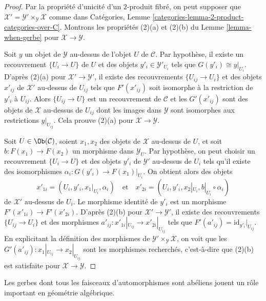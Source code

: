 \begin{proof}
Par la propriété d'unicité d'un $2$-produit fibré, on peut supposer que
$\mathcal{X}' = \mathcal{Y}' \times_\mathcal{Y} \mathcal{X}$
comme dans
Catégories, Lemme \ref{categories-lemma-2-product-categories-over-C}.
Montrons les propriétés (2)(a) et (2)(b) du
Lemme \ref{lemma-when-gerbe}
pour $\mathcal{X} \to \mathcal{Y}$.

\medskip\noindent
Soit $y$ un objet de $\mathcal{Y}$ au-dessus de l'objet $U$
de $\mathcal{C}$. Par hypothèse, il existe
un recouvrement $\{U_i \to U\}$ de $U$ et des objets
$y'_i \in \mathcal{Y}'_{U_i}$ tels que $G(y'_i) \cong y|_{U_i}$.
D'après (2)(a) pour $\mathcal{X}' \to \mathcal{Y}'$, il existe des
recouvrements $\{U_{ij} \to U_i\}$ et des objets $x'_{ij}$ de
$\mathcal{X}'$ au-dessus de $U_{ij}$ tels que $F'(x'_{ij})$ soit isomorphe
à la restriction de $y'_i$ à $U_{ij}$. Alors
$\{U_{ij} \to U\}$ est un recouvrement de $\mathcal{C}$ et les
$G'(x'_{ij})$ sont des objets de $\mathcal{X}$ au-dessus de $U_{ij}$
dont les images dans $\mathcal{Y}$ sont isomorphes aux restrictions
$y|_{U_{ij}}$. Cela prouve (2)(a) pour $\mathcal{X} \to \mathcal{Y}$.

\medskip\noindent
Soit $U \in \Ob(\mathcal{C})$, soient $x_1, x_2$ des objets de
$\mathcal{X}$ au-dessus de $U$, et soit $b : F(x_1) \to F(x_2)$ un morphisme
dans $\mathcal{Y}_U$. Par hypothèse, on peut choisir un recouvrement
$\{U_i \to U\}$ et des objets $y'_i$ de $\mathcal{Y}'$
au-dessus de $U_i$ tels qu'il existe des isomorphismes
$\alpha_i : G(y'_i) \to F(x_1)|_{U_i}$.
On obtient alors des objets
$$
x'_{1i} = (U_i, y'_i, x_1|_{U_i}, \alpha_i)
\quad\text{et}\quad
x'_{2i} = (U_i, y'_i, x_2|_{U_i}, b|_{U_i} \circ \alpha_i)
$$
de $\mathcal{X}'$ au-dessus de $U_i$. Le morphisme identité de $y'_i$ est un
morphisme $F'(x'_{1i}) \to F'(x'_{2i})$. D'après (2)(b) pour
$\mathcal{X}' \to \mathcal{Y}'$, il existe des recouvrements
$\{U_{ij} \to U_i\}$ et des morphismes
$a'_{ij} : x'_{1i}|_{U_{ij}} \to x'_{2i}|_{U_{ij}}$
tels que $F'(a'_{ij}) = \text{id}_{y'_i}|_{U_{ij}}$. En explicitant la définition
des morphismes de $\mathcal{Y}' \times_\mathcal{Y} \mathcal{X}$,
on voit que les $G'(a'_{ij}) : x_1|_{U_{ij}} \to x_2|_{U_{ij}}$ sont
les morphismes recherchés, c'est-à-dire que (2)(b) est satisfaite pour
$\mathcal{X} \to \mathcal{Y}$.
\end{proof}

\noindent
Les gerbes dont tous les faisceaux d'automorphismes sont abéliens jouent un rôle
important en géométrie algébrique.

